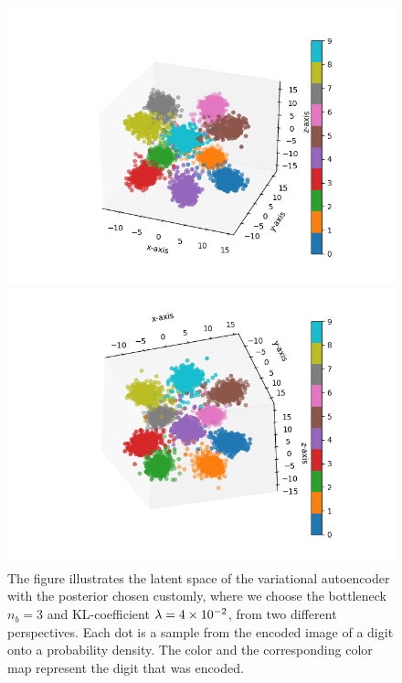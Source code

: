 \begin{figure}
\begin{center}
   \begin{minipage}[b]{0.49\linewidth}
      \includegraphics[trim = 20mm 10mm 20mm 10mm, clip, width=\linewidth]{convolutional_VAE_new_idea_KL_4e-2_10k_epochs_3D_latent_1}
	\end{minipage}
   \begin{minipage}[b]{0.49\linewidth}
      \includegraphics[trim = 20mm 10mm 20mm 10mm, clip, width=\linewidth]{convolutional_VAE_new_idea_KL_4e-2_10k_epochs_3D_latent_2}
	\end{minipage}
\end{center}
\caption{The figure illustrates the latent space of the variational autoencoder with the posterior chosen customly, where we choose the bottleneck $n_b=3$ and KL-coefficient $\lambda = \num{4e-2}$, from two different perspectives. Each dot is a sample from the encoded image of a digit onto a probability density. The color and the corresponding color map represent the digit that was encoded.}\label{fig:convolutional_VAE_new_idea_KL_4e-2_10k_epochs_3D_latent}
\end{figure}


